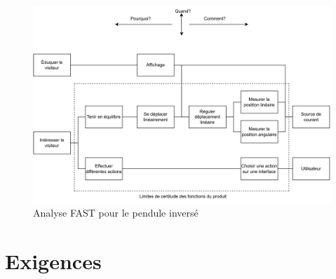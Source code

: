 \begin{figure}[H]
  \centering
  \includegraphics[width = \textwidth]{assets/figures/AnalyseFAST.svg}
  \caption{Analyse FAST pour le pendule inversé}
  \label{fig:AnalFAST}
\end{figure}

\section{Exigences}\label{sec:Exigences}

